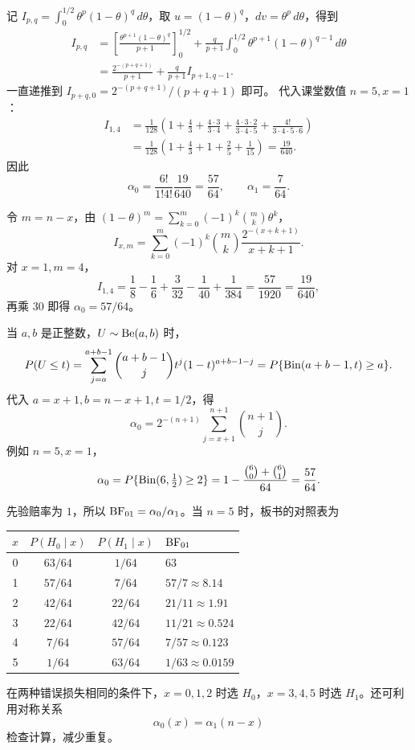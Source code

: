 记 $I_{p,q}=\int_0^{1/2}\theta^p(1-\theta)^q\,d\theta$，取
$u=(1-\theta)^q$，$dv=\theta^p\,d\theta$，得到
\begin{align*}
I_{p,q}
&=\left[\frac{\theta^{p+1}(1-\theta)^q}{p+1}\right]_0^{1/2}
+\frac q{p+1}\int_0^{1/2}\theta^{p+1}(1-\theta)^{q-1}\,d\theta\\
&=\frac{2^{-(p+q+1)}}{p+1}+\frac q{p+1}I_{p+1,q-1}.
\end{align*}
一直递推到 $I_{p+q,0}=2^{-(p+q+1)}/(p+q+1)$ 即可。
代入课堂数值 $n=5,x=1$：
\begin{align*}
I_{1,4}
&=\frac1{128}\left(1+\frac43+\frac{4\cdot3}{3\cdot4}
+\frac{4\cdot3\cdot2}{3\cdot4\cdot5}
+\frac{4!}{3\cdot4\cdot5\cdot6}\right)\\
&=\frac1{128}\left(1+\frac43+1+\frac25+\frac1{15}\right)
=\frac{19}{640}.
\end{align*}
因此
\[
\alpha_0=\frac{6!}{1!4!}\frac{19}{640}=\frac{57}{64},\qquad
\alpha_1=\frac7{64}.
\]

令 $m=n-x$，由 $(1-\theta)^m=\sum_{k=0}^m(-1)^k\binom mk\theta^k$，
\[
I_{x,m}=\sum_{k=0}^m(-1)^k\binom mk
\frac{2^{-(x+k+1)}}{x+k+1}.
\]
对 $x=1,m=4$，
\[
I_{1,4}=\frac18-\frac16+\frac3{32}-\frac1{40}+\frac1{384}
=\frac{57}{1920}=\frac{19}{640},
\]
再乘 $30$ 即得 $\alpha_0=57/64$。

当 $a,b$ 是正整数，$U\sim\operatorname{Be}(a,b)$ 时，
\[
P(U\leq t)=\sum_{j=a}^{a+b-1}\binom{a+b-1}{j}t^j(1-t)^{a+b-1-j}
=P\{\operatorname{Bin}(a+b-1,t)\geq a\}.
\]
代入 $a=x+1,b=n-x+1,t=1/2$，得
\[
\boxed{\alpha_0=2^{-(n+1)}\sum_{j=x+1}^{n+1}\binom{n+1}{j}.}
\]
例如 $n=5,x=1$，
\[
\alpha_0=P\{\operatorname{Bin}(6,\tfrac12)\geq2\}
=1-\frac{\binom60+\binom61}{64}=\frac{57}{64}.
\]

先验赔率为 $1$，所以 $\operatorname{BF}_{01}=\alpha_0/\alpha_1$。当 $n=5$ 时，板书的对照表为
\begin{center}
\begin{tabular}{cccl}
\toprule
$x$&$P(H_0\mid x)$&$P(H_1\mid x)$&$\operatorname{BF}_{01}$\\
\midrule
0&$63/64$&$1/64$&$63$\\
1&$57/64$&$7/64$&$57/7\approx8.14$\\
2&$42/64$&$22/64$&$21/11\approx1.91$\\
3&$22/64$&$42/64$&$11/21\approx0.524$\\
4&$7/64$&$57/64$&$7/57\approx0.123$\\
5&$1/64$&$63/64$&$1/63\approx0.0159$\\
\bottomrule
\end{tabular}
\end{center}
在两种错误损失相同的条件下，$x=0,1,2$ 时选 $H_0$，$x=3,4,5$ 时选 $H_1$。还可利用对称关系
\[
\alpha_0(x)=\alpha_1(n-x)
\]
检查计算，减少重复。


